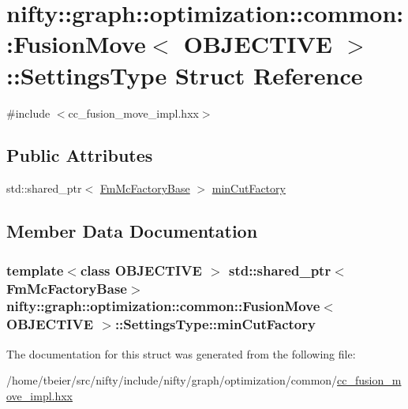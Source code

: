 \hypertarget{structnifty_1_1graph_1_1optimization_1_1common_1_1FusionMove_1_1SettingsType}{}\section{nifty\+:\+:graph\+:\+:optimization\+:\+:common\+:\+:Fusion\+Move$<$ O\+B\+J\+E\+C\+T\+I\+V\+E $>$\+:\+:Settings\+Type Struct Reference}
\label{structnifty_1_1graph_1_1optimization_1_1common_1_1FusionMove_1_1SettingsType}


{\ttfamily \#include $<$cc\+\_\+fusion\+\_\+move\+\_\+impl.\+hxx$>$}

\subsection*{Public Attributes}
\begin{DoxyCompactItemize}
\item 
std\+::shared\+\_\+ptr$<$ \hyperlink{classnifty_1_1graph_1_1optimization_1_1common_1_1FusionMove_a6af63b2ed662deb28c716c462669cb37}{Fm\+Mc\+Factory\+Base} $>$ \hyperlink{structnifty_1_1graph_1_1optimization_1_1common_1_1FusionMove_1_1SettingsType_ae365920c8854607d4eac2e9af2ec2e52}{min\+Cut\+Factory}
\end{DoxyCompactItemize}


\subsection{Member Data Documentation}
\hypertarget{structnifty_1_1graph_1_1optimization_1_1common_1_1FusionMove_1_1SettingsType_ae365920c8854607d4eac2e9af2ec2e52}{}
\subsubsection[{min\+Cut\+Factory}]{\setlength{\rightskip}{0pt plus 5cm}template$<$class O\+B\+J\+E\+C\+T\+I\+V\+E $>$ std\+::shared\+\_\+ptr$<${\bf Fm\+Mc\+Factory\+Base}$>$ {\bf nifty\+::graph\+::optimization\+::common\+::\+Fusion\+Move}$<$ O\+B\+J\+E\+C\+T\+I\+V\+E $>$\+::Settings\+Type\+::min\+Cut\+Factory}\label{structnifty_1_1graph_1_1optimization_1_1common_1_1FusionMove_1_1SettingsType_ae365920c8854607d4eac2e9af2ec2e52}


The documentation for this struct was generated from the following file\+:\begin{DoxyCompactItemize}
\item 
/home/tbeier/src/nifty/include/nifty/graph/optimization/common/\hyperlink{cc__fusion__move__impl_8hxx}{cc\+\_\+fusion\+\_\+move\+\_\+impl.\+hxx}\end{DoxyCompactItemize}
